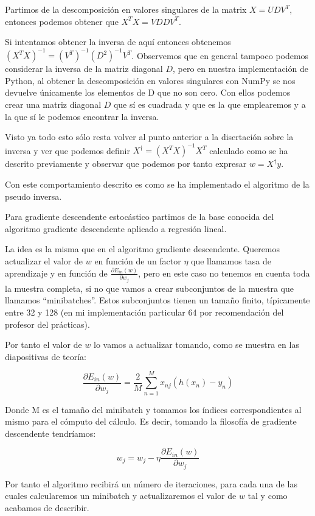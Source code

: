 \documentclass[12pt,a4paper]{article}
\begin{document}
Partimos de la descomposición en valores singulares de la matrix $X = UDV^T$, entonces podemos obtener que $X^TX = VDDV^T$.

Si intentamos obtener la inversa de aquí entonces obtenemos $(X^TX)^{-1} = (V^T)^{-1}(D^2)^{-1}V^T$. Observemos que en general tampoco podemos considerar la inversa de la matriz diagonal $D$, pero en nuestra implementación de Python, al obtener la descomposición en valores singulares con NumPy se nos devuelve únicamente los elementos de D que no son cero. Con ellos podemos crear una matriz diagonal $D$ que sí es cuadrada y que es la que emplearemos y a la que sí le podemos encontrar la inversa.

Visto ya todo esto sólo resta volver al punto anterior a la disertación sobre la inversa y ver que podemos definir $X^{\dagger} = (X^T X)^{-1}X^T$ calculado como se ha descrito previamente y observar que podemos por tanto expresar $w = X^{\dagger}y$.

Con este comportamiento descrito es como se ha implementado el algoritmo de la pseudo inversa.

Para gradiente descendente estocástico partimos de la base conocida del algoritmo gradiente descendente aplicado a regresión lineal.

La idea es la misma que en el algoritmo gradiente descendente. Queremos actualizar el valor de $w$ en función de un factor $\eta$ que llamamos tasa de aprendizaje y en función de $\frac{\partial E_{in}(w)}{\partial w_j}$, pero en este caso no tenemos en cuenta toda la muestra completa, si no que vamos a crear subconjuntos de la muestra que llamamos ``minibatches''. Estos subconjuntos tienen un tamaño finito, típicamente entre 32 y 128 (en mi implementación particular 64 por recomendación del profesor del prácticas).

Por tanto el valor de $w$ lo vamos a actualizar tomando, como se muestra en las diapositivas de teoría:

$$\frac{\partial E_{in}(w)}{\partial w_j} = \frac{2}{M}\sum_{n=1}^{M}x_{nj}(h(x_n)-y_n)$$

Donde M es el tamaño del minibatch y tomamos los índices correspondientes al mismo para el cómputo del cálculo. Es decir, tomando la filosofía de gradiente descendente tendríamos:

$$w_j = w_j - \eta \frac{\partial E_{in}(w)}{\partial w_j}$$

Por tanto el algoritmo recibirá un número de iteraciones, para cada una de las cuales calcularemos un minibatch y actualizaremos el valor de $w$ tal y como acabamos de describir.
\end{document}
